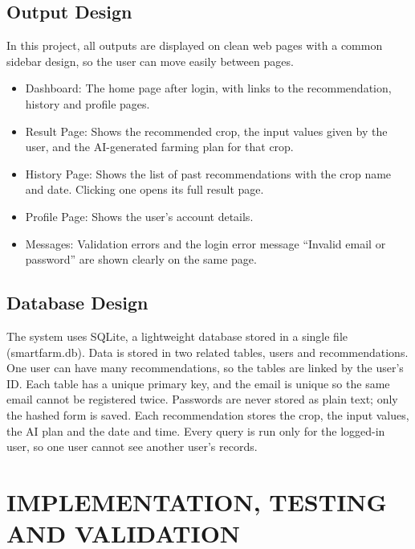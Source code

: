 \section{Output Design}
 In this project, all outputs are displayed on clean web pages with a common sidebar design, so the user can move easily between pages.
\begin{itemize}
\item Dashboard: The home page after login, with links to the recommendation, history and profile pages.
\item Result Page: Shows the recommended crop, the input values given by the user, and the AI-generated farming plan for that crop.
\item History Page: Shows the list of past recommendations with the crop name and date. Clicking one opens its full result page.
\item Profile Page: Shows the user’s account details.
\item Messages: Validation errors and the login error message “Invalid email or password” are shown clearly on the same page.
\end{itemize}
%
\section{Database Design}
The system uses SQLite, a lightweight database stored in a single file (smartfarm.db). Data is stored in two related tables, users and recommendations. One user can have many recommendations, so the tables are linked by the user’s ID. Each table has a unique primary key, and the email is unique so the same email cannot be registered twice. Passwords are never stored as plain text; only the hashed form is saved. Each recommendation stores the crop, the input values, the AI plan and the date and time. Every query is run only for the logged-in user, so one user cannot see another user’s records.
%
%
%
%
\chapter{IMPLEMENTATION, TESTING AND VALIDATION}
%
